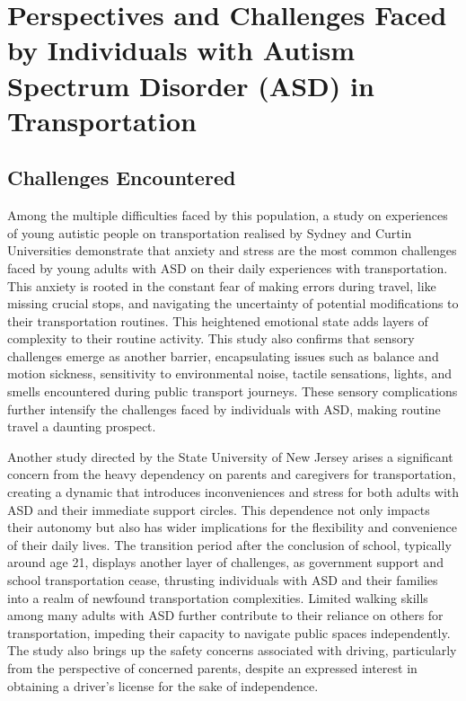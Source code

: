 \section{Perspectives and Challenges Faced by Individuals with Autism Spectrum Disorder (ASD) in Transportation}
    
\subsection{Challenges Encountered}

    Among the multiple difficulties faced by this population, a study on experiences of young autistic people on transportation realised by Sydney and Curtin Universities \cite{haas_experiences_nodate} demonstrate that anxiety and stress are the most common challenges faced by young adults with ASD on their daily experiences with transportation. This anxiety is rooted in the constant fear of making errors during travel, like missing crucial stops, and navigating the uncertainty of potential modifications to their transportation routines. This heightened emotional state adds layers of complexity to their routine activity. 
    This study also confirms that sensory challenges emerge as another barrier, encapsulating issues such as balance and motion sickness, sensitivity to environmental noise, tactile sensations, lights, and smells encountered during public transport journeys. These sensory complications further intensify the challenges faced by individuals with ASD, making routine travel a daunting prospect. 

    Another study directed by the State University of New Jersey \cite{deka_co-principal_nodate}arises a significant concern from the heavy dependency on parents and caregivers for transportation, creating a dynamic that introduces inconveniences and stress for both adults with ASD and their immediate support circles. This dependence not only impacts their autonomy but also has wider implications for the flexibility and convenience of their daily lives.
    The transition period after the conclusion of school, typically around age 21, displays another layer of challenges, as government support and school transportation cease, thrusting individuals with ASD and their families into a realm of newfound transportation complexities. 
    Limited walking skills among many adults with ASD further contribute to their reliance on others for transportation, impeding their capacity to navigate public spaces independently. 
    The study also brings up the safety concerns associated with driving, particularly from the perspective of concerned parents, despite an expressed interest in obtaining a driver's license for the sake of independence. 

